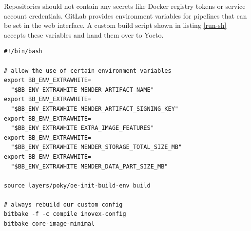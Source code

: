 Repositories should not contain any secrets like Docker registry tokens or service account credentials. GitLab provides environment variables for pipelines that can be set in the web interface. A custom build script shown in listing \ref{run-sh} accepts these variables and hand them over to Yocto.
\begin{code}
  \label{run-sh}
  \begin{verbatim}
#!/bin/bash

# allow the use of certain environment variables
export BB_ENV_EXTRAWHITE=
  "$BB_ENV_EXTRAWHITE MENDER_ARTIFACT_NAME"
export BB_ENV_EXTRAWHITE=
  "$BB_ENV_EXTRAWHITE MENDER_ARTIFACT_SIGNING_KEY"
export BB_ENV_EXTRAWHITE=
  "$BB_ENV_EXTRAWHITE EXTRA_IMAGE_FEATURES"
export BB_ENV_EXTRAWHITE=
  "$BB_ENV_EXTRAWHITE MENDER_STORAGE_TOTAL_SIZE_MB"
export BB_ENV_EXTRAWHITE=
  "$BB_ENV_EXTRAWHITE MENDER_DATA_PART_SIZE_MB"

source layers/poky/oe-init-build-env build

# always rebuild our custom config
bitbake -f -c compile inovex-config
bitbake core-image-minimal
  \end{verbatim}
\end{code}

